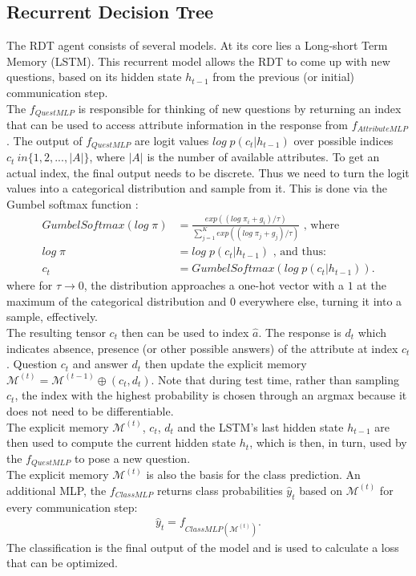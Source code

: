 \documentclass[a4paper,cleardoubleempty,BCOR1cm, 11pt]{report}
\begin{document}
\subsection{Recurrent Decision Tree}
The RDT agent consists of several models. At its core lies a Long-short Term Memory (LSTM). This recurrent model allows the RDT to come up with new questions, based on its hidden state $h_{t-1}$ from the previous (or initial) communication step.\\
The $f_{QuestMLP}$ is responsible for thinking of new questions by returning an index that can be used to access attribute information in the response from $f_{AttributeMLP}$. The output of $f_{QuestMLP}$ are logit values $log\;p(c_t|h_{t-1})$ over possible indices $c_t \ in \lbrace 1,2,...,|A| \rbrace$, where $|A|$ is the number of available attributes. To get an actual index, the final output needs to be discrete. Thus we need to turn the logit values into a categorical distribution and sample from it. This is done via the Gumbel softmax function \cite{jang2016categorical}:
\begin{align}
		GumbelSoftmax(log\;\pi) &= \frac{exp((log\;\pi_i + g_i)/\tau)}{\sum_{j=1}^{K}exp((log\;\pi_j + g_j)/\tau)}\text{ , where}\\
			log\;\pi &=log\;p(c_t|h_{t-1})\text{ , and thus:}\\
			c_t &= GumbelSoftmax(log\;p(c_t|h_{t-1})).
\end{align}
where for $\tau \rightarrow 0$, the distribution approaches a one-hot vector with a $1$ at the maximum of the categorical distribution and $0$ everywhere else, turning it into a sample, effectively.\\
The resulting tensor $c_t$ then can be used to index $\hat{a}$. The response is $d_t$ which indicates absence, presence (or other possible answers) of the attribute at index $c_t$. Question $c_t$ and answer $d_t$ then update the explicit memory $\mathcal{M}^{(t)} = \mathcal{M}^{(t-1)} \oplus (c_t, d_t)$. Note that during test time, rather than sampling $c_t$, the index with the highest probability is chosen through an argmax because it does not need to be differentiable.\\
The explicit memory $\mathcal{M}^{(t)}$, $c_t$, $d_t$ and the LSTM's last hidden state $h_{t-1}$ are then used to compute the current hidden state $h_t$, which is then, in turn, used by the $f_{QuestMLP}$ to pose a new question.\\
The explicit memory $\mathcal{M}^{(t)}$ is also the basis for the class prediction. An additional MLP, the $f_{ClassMLP}$ returns class probabilities $\hat{y}_t$ based on  $\mathcal{M}^{(t)}$ for every communication step:
\begin{align}
	\hat{y}_t = f_{ClassMLP( \mathcal{M}^{(t)})}.
\end{align} The classification is the final output of the model and is used to calculate a loss that can be optimized.
\end{document}
